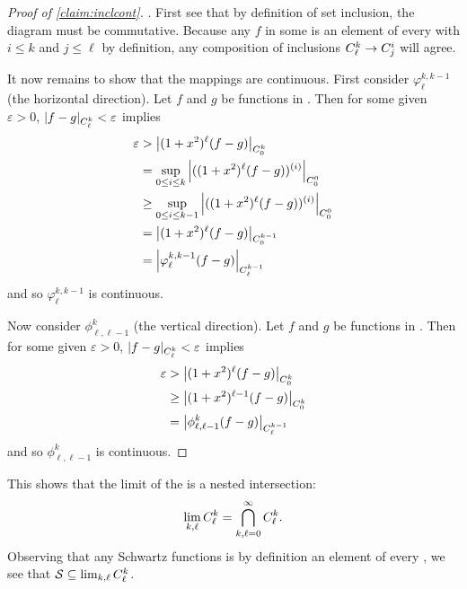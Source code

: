      \begin{proof}[Proof of \cref{claim:inclcont}]
        .
        First see that by definition of set inclusion, the diagram must be commutative.
        Because any $f$ in some \Ckl is an element of every \Cij with $i\le k$ and $j\le\ell$ by definition, any composition of inclusions ${C^k_\ell}\rightarrow{C^i_j}$ will agree.

        It now remains to show that the mappings are continuous.
        First consider $\varphi^{k,k-1}_\ell$ (the horizontal direction).
        Let $f$ and $g$ be functions in \Ckl.
        Then for some given $\varepsilon>0$, $|f-g|_{C^k_\ell}<\varepsilon$ implies
        \begin{align*}
          \varepsilon &> \left|(1+x^2)^\ell(f-g)\right|_{C^k_0}
          \\&= \sup_{0\le i\le k} \left|((1+x^2)^\ell(f-g))^{(i)}\right|_{C^0_0}
          \\&\ge \sup_{0\le i\le k-1} \left|((1+x^2)^\ell(f-g))^{(i)}\right|_{C^0_0} 
          \\&= \left|(1+x^2)^\ell(f-g)\right|_{C^{k-1}_0}
          \\&= \left|\varphi^{k,k-1}_\ell(f-g)\right|_{C^{k-1}_\ell}
        \end{align*}
        and so $\varphi^{k,k-1}_\ell$ is continuous.

        Now consider $\phi^k_{\ell,\ell-1}$ (the vertical direction).
        Let $f$ and $g$ be functions in \Ckl.
        Then for some given $\varepsilon>0$, $|f-g|_{C^k_\ell}<\varepsilon$ implies
        \begin{align*}
          \varepsilon &> \left|(1+x^2)^\ell(f-g)\right|_{C^k_0}
          \\&\ge \left|(1+x^2)^{\ell-1}(f-g)\right|_{C^k_0}
          \\&= \left|\phi^k_{\ell,\ell-1}(f-g)\right|_{C^{k-1}_\ell}
        \end{align*}
        and so $\phi^k_{\ell,\ell-1}$ is continuous.
      \end{proof}
      \begin{rmk}
        This shows that the limit of the \Ckl is a nested intersection:
        \begin{align*}
          \lim_{k,\ell}{C^k_\ell} = \bigcap_{k,\ell=0}^\infty {C^k_\ell}\text{.}
        \end{align*}
        Observing that any Schwartz functions is by definition an element of every \Ckl, we see that $\mathcal{S}\subseteq\lim_{k,\ell}{C^k_\ell}$.
      \end{rmk}

